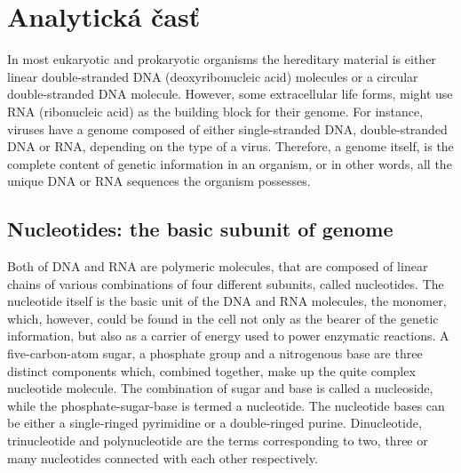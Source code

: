 
\chapter{Analytická časť}

In most eukaryotic and prokaryotic organisms the hereditary material is either linear double-stranded DNA 
(deoxyribonucleic acid) molecules or a circular double-stranded DNA molecule. However, some extracellular life forms, 
might use RNA (ribonucleic acid) as the building block for their genome. For instance, viruses have a genome composed of 
either single-stranded DNA, double-stranded DNA or RNA, depending on the type of a virus. Therefore, a genome itself, 
is the complete content of genetic information in an organism, or in other words, all the unique DNA or RNA sequences the organism possesses. 
\section{Nucleotides: the basic subunit of genome}

Both of DNA and RNA  are polymeric molecules, that are composed of linear chains of various combinations of four different subunits, called nucleotides. 
The nucleotide itself is the basic unit of the DNA and RNA molecules, the monomer, which, however, could be found in the cell not only as the bearer of the genetic information, 
but also as a carrier of energy used to power enzymatic reactions. A five-carbon-atom sugar, a phosphate group and a nitrogenous base are three distinct components which, 
combined together, make up the quite complex nucleotide molecule. The combination of sugar and base is called a nucleoside, while the phosphate-sugar-base is termed a nucleotide. 
The nucleotide bases can be either a single-ringed pyrimidine or a double-ringed purine. Dinucleotide, trinucleotide and polynucleotide are the terms corresponding to two, 
three or many nucleotides connected with each other respectively.

